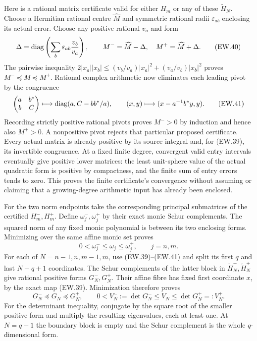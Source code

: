 Here is a rational matrix certificate valid for either $H_m$ or
any of these $\widetilde H_N$. Choose a Hermitian rational centre
$\widehat M$ and symmetric rational radii $\varepsilon_{ab}$
enclosing its actual error. Choose any positive rational $v_a$ and
form
\[
 \Delta=\operatorname{diag}\left(\sum_b\varepsilon_{ab}\frac{v_b}{v_a}\right),
 \qquad M^-=\widehat M-\Delta,\quad M^+=\widehat M+\Delta.
                                                               \tag{EW.40}
\]
The pairwise inequality
$2|x_a||x_b|\le(v_b/v_a)|x_a|^2+(v_a/v_b)|x_b|^2$
proves $M^-\preceq M\preceq M^+$. Rational complex arithmetic
now eliminates each leading pivot by the congruence
\[
 \begin{pmatrix}a&b^*\\b&C\end{pmatrix}
 \longmapsto\operatorname{diag}(a,C-bb^*/a),\qquad
 (x,y)\longmapsto(x-a^{-1}b^*y,y).                           \tag{EW.41}
\]
Recording strictly positive rational pivots proves $M^->0$ by
induction and hence also $M^+>0$. A nonpositive pivot rejects that
particular proposed certificate. Every actual matrix is already
positive by its source integral and, for (EW.39), its invertible
congruence. At a fixed finite degree, convergent valid entry intervals
eventually give positive lower matrices: the least unit-sphere value
of the actual quadratic form is positive by compactness, and the
finite sum of entry errors tends to zero. This proves the finite
certificate's convergence without assuming or claiming that a
growing-degree arithmetic input has already been enclosed.

For the two norm endpoints take the corresponding principal
submatrices of the certified $H_m^-,H_m^+$. Define
$\omega_j^-,\omega_j^+$ by their exact monic Schur complements.
The squared norm of any fixed monic polynomial is between its two
enclosing forms. Minimizing over the same affine monic set proves
\[
 0<\omega_j^-\le\omega_j\le\omega_j^+,
 \qquad j=n,m.                                               \tag{EW.42}
\]
For each of $N=n-1,n,m-1,m$, use (EW.39)--(EW.41) and split
its first $q$ and last $N-q+1$ coordinates. The Schur complements
of the latter block in $\widetilde H_N^-,\widetilde H_N^+$
give rational positive forms $G_N^-,G_N^+$. Their affine fibre
has fixed first coordinate $x$, by the exact map (EW.39).
Minimization therefore proves
\[
 G_N^-\preceq G_N\preceq G_N^+,\qquad
 0<V_N^-:=\det G_N^-\le V_N\le\det G_N^+=:V_N^+.
                                                               \tag{EW.43}
\]
For the determinant inequality, conjugate by the square root of
the smaller positive form and multiply the resulting eigenvalues,
each at least one. At $N=q-1$ the boundary block is empty and
the Schur complement is the whole $q$-dimensional form.

